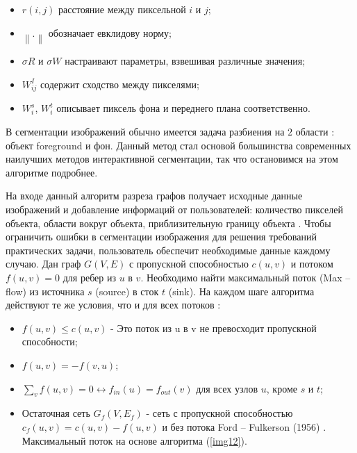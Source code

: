\begin{itemize}
	\item $r\left(i,j\right)$ расстояние между пиксельной $i$ и $j$;
	\item $\left\|.\right\|$ обозначает евклидову норму;
	\item $\sigma R$ и $\sigma W$ настраивают параметры, взвешивая различные значения;
	\item $W^I_{ij}$ содержит сходство между пикселями;
	\item $W^s_i$, $W^t_i$ описывает пиксель фона и переднего плана соответственно.
\end{itemize}
В сегментации изображений обычно имеется задача разбиения на $2$ области : объект foreground и фон. Данный метод стал основой большинства современных наилучших методов интерактивной сегментации, так что остановимся на этом алгоритме подробнее.

На входе данный алгоритм разреза графов получает исходные данные изображений и добавление информаций от пользователей: количество пикселей объекта, области вокруг объекта, приблизительную границу объекта \cite{Boykov2001}. Чтобы ограничить ошибки в сегментации изображения для решения требований практических задачи, пользователь обеспечит необходимые данные каждому случаю. Дан граф $G\left(V,E\right)$ с пропускной способностью $c\left(u,v\right)$ и потоком $f\left(u,v\right)=0$ для ребер из $u$ в $v$. Необходимо найти максимальный поток (Max – flow) из источника $s$  (source) в сток $t$ (sink). На каждом шаге алгоритма действуют те же условия, что и для всех потоков \cite{Cormen2001}:

\begin{itemize}
	\item $f\left(u,v\right) \leq c\left(u,v\right)$ - Это поток из u в v не превосходит пропускной способности;
	\item $f\left(u,v\right) =-f\left(v,u\right)$;
	\item $\sum_vf\left(u,v\right)=0 \leftrightarrow f_{in}\left(u\right) =f_{out}\left(v\right)$ для всех узлов $u$, кроме $s$ и $t$;
	\item Остаточная сеть $G_f\left(V,E_f\right)$ - сеть с  пропускной способностью $c_f\left(u,v\right)=c\left(u,v\right)-f\left(u,v\right)$ и без потока Ford – Fulkerson (1956) \cite{Ford1956}. Максимальный поток на основе алгоритма (\ref{img12}).
\end{itemize}

